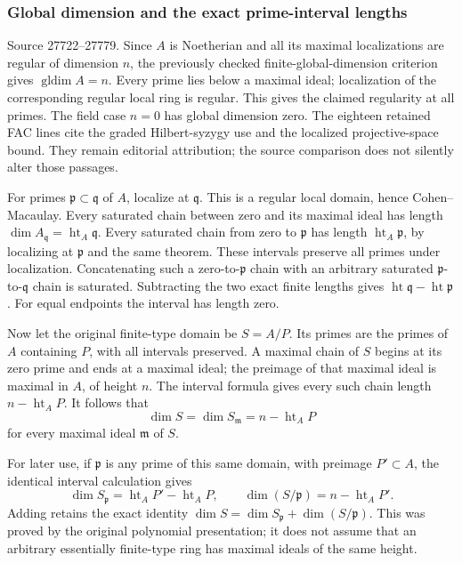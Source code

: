 \subsubsection{Global dimension and the exact prime-interval lengths}\label{algebra-proof-025-global-dimension-and-the-exact-prime-interval-lengths}

Source 27722--27779. Since \(A\) is Noetherian and all its maximal localizations are regular of dimension \(n\), the previously checked finite-global-dimension criterion gives \(\operatorname{gldim}A=n\). Every prime lies below a maximal ideal; localization of the corresponding regular local ring is regular. This gives the claimed regularity at all primes. The field case \(n=0\) has global dimension zero. The eighteen retained FAC lines cite the graded Hilbert-syzygy use and the localized projective-space bound. They remain editorial attribution; the source comparison does not silently alter those passages.

For primes \(\mathfrak p\subset\mathfrak q\) of \(A\), localize at \(\mathfrak q\). This is a regular local domain, hence Cohen--Macaulay. Every saturated chain between zero and its maximal ideal has length \(\dim A_{\mathfrak q}=\operatorname{ht}_A\mathfrak q\). Every saturated chain from zero to \(\mathfrak p\) has length \(\operatorname{ht}_A\mathfrak p\), by localizing at \(\mathfrak p\) and the same theorem. These intervals preserve all primes under localization. Concatenating such a zero-to-\(\mathfrak p\) chain with an arbitrary saturated \(\mathfrak p\)-to-\(\mathfrak q\) chain is saturated. Subtracting the two exact finite lengths gives \(\operatorname{ht}\mathfrak q-\operatorname{ht}\mathfrak p\). For equal endpoints the interval has length zero.

Now let the original finite-type domain be \(S=A/P\). Its primes are the primes of \(A\) containing \(P\), with all intervals preserved. A maximal chain of \(S\) begins at its zero prime and ends at a maximal ideal; the preimage of that maximal ideal is maximal in \(A\), of height \(n\). The interval formula gives every such chain length \(n-\operatorname{ht}_A P\). It follows that \[
 \dim S=\dim S_{\mathfrak m}=n-\operatorname{ht}_A P
\] for every maximal ideal \(\mathfrak m\) of \(S\).

For later use, if \(\mathfrak p\) is any prime of this same domain, with preimage \(P'\subset A\), the identical interval calculation gives \[
 \dim S_{\mathfrak p}=\operatorname{ht}_A P'-\operatorname{ht}_A P,
 \qquad
 \dim(S/\mathfrak p)=n-\operatorname{ht}_A P'.
\] Adding retains the exact identity \(\dim S=\dim S_{\mathfrak p}+\dim(S/\mathfrak p)\). This was proved by the original polynomial presentation; it does not assume that an arbitrary essentially finite-type ring has maximal ideals of the same height.

